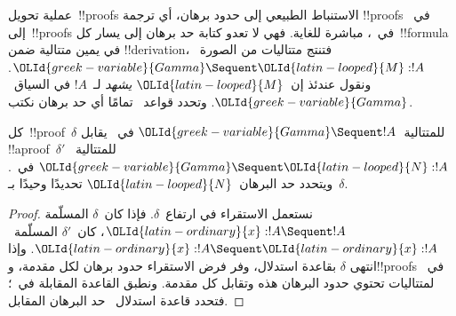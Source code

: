 \documentclass[../../../include/open-logic-section]{subfiles}
\begin{document}


عملية تحويل~!!{proof}s الاستنباط الطبيعي إلى حدود برهان، أي ترجمة
!!{proof}s في~ إلى~!!{proof}s في~، مباشرة للغاية. فهي
لا تعدو كتابة حد برهان إلى يسار كل~!!{formula} في يمين متتالية ضمن
!!{derivation}، فتنتج متتاليات من الصورة~$\OLId{greek-variable}{Gamma}\Sequent \OLId{latin-looped}{M}:!A$. ونقول عندئذ
إن~$\OLId{latin-looped}{M}$ \emph{يشهد} لـ~$!A$ في السياق~$\OLId{greek-variable}{Gamma}$. وتحدد قواعد~
تمامًا أي حد برهان نكتب.

\begin{prop}
كل~!!{proof}~$\delta$ للمتتالية~$\OLId{greek-variable}{Gamma}\Sequent !A$ في~ يقابل
!!a{proof}~$\delta'$ للمتتالية~$\OLId{greek-variable}{Gamma}\Sequent \OLId{latin-looped}{N}:!A$ في~.
ويتحدد حد البرهان~$\OLId{latin-looped}{N}$ تحديدًا وحيدًا بـ~$\delta$.
\end{prop}

\begin{proof}
نستعمل الاستقراء في ارتفاع~$\delta$. فإذا كان~$\delta$ المسلّمة
$\OLId{latin-ordinary}{x}:!A\Sequent !A$، كان~$\delta'$ المسلّمة~$\OLId{latin-ordinary}{x}:!A\Sequent \OLId{latin-ordinary}{x}:!A$. وإذا انتهى
$\delta$ بقاعدة استدلال، وفر فرض الاستقراء حدود برهان لكل مقدمة، و!!{proof}s
في~ لمتتاليات تحتوي حدود البرهان هذه وتقابل كل مقدمة. ونطبق
القاعدة المقابلة في~؛ فتحدد قاعدة استدلال~ حد البرهان
المقابل.
\end{proof}
\end{document}
